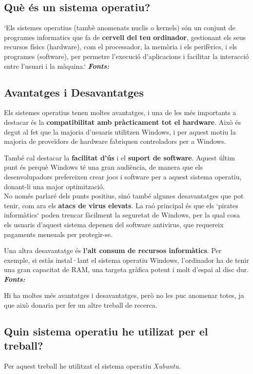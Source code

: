 \subsection{Què és un sistema operatiu?}
`Els sistemes operatius (tambè anomenats nuclis o kernels) són un conjunt de programes informatics que fa de \textbf{cervell del teu ordinador}, gestionant els seus recursos físics (hardware), com el processador, la memòria i els perifèrics, i els programes (software), per permetre l'execució d'aplicacions i facilitar la interacció entre l'usuari i la màquina.`  \textit{\textbf{Fonts:}} \cite{EE}
\subsection{Avantatges i Desavantatges}
Els sistemes operatius tenen moltes avantatges, i una de les més importants a destacar és la \textbf{compatibilitat amb pràcticament tot el hardware}. Això és degut al fet que la majoria d’usuaris utilitzen Windows, i per aquest motiu la majoria de proveïdors de hardware fabriquen controladors per a Windows.

També cal destacar la \textbf{facilitat d’ús} i el \textbf{suport de software}. Aquest últim punt és perquè Windows té una gran audiència, de manera que els desenvolupadors prefereixen crear jocs i software per a aquest sistema operatiu, donant-li una major optimització.\\

No només parlaré dels punts positius, sinó també algunes desavantatges que pot tenir, com ara els \textbf{atacs de virus elevats}. La raó principal és que els `pirates informàtics` poden trencar fàcilment la seguretat de Windows, per la qual cosa els usuaris d’aquest sistema depenen del software antivirus, que requereix pagaments mensuals per protegir-se.

Una altra desavantatge és \textbf{l’alt consum de recursos informàtics}. Per exemple, si estàs instal·lant el sistema operatiu Windows, l’ordinador ha de tenir una gran capacitat de RAM, una targeta gràfica potent i molt d’espai al disc dur.
\textit{\textbf{Fonts:}} \cite{AS}

Hi ha moltes més avantatges i desavantatges, però no les puc anomenar totes, ja que això donaria per fer un altre treball de recerca.

\subsection{Quin sistema operatiu he utilizat per el treball?}
Per aquest treball he utilitzat el sistema operatiu \textit{Xubuntu}\cite{xubuntu}.

